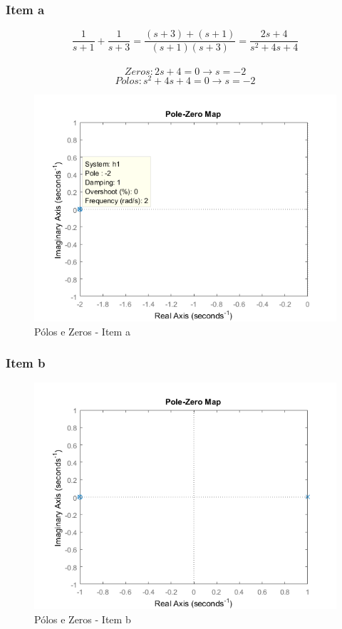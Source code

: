\documentclass[a4paper, 12pt]{article}
\begin{document}
        \subsubsection{Item a}
        \[\frac{1}{s+1} + \frac{1}{s+3} = \frac{(s+3) + (s+1)}{(s+1)(s+3)} = \frac{2s + 4}{s^{2} + 4s + 4}\]\\
        \[Zeros: 2s + 4 = 0 \rightarrow s = -2\]
        \[Polos:  s^{2} + 4s + 4 = 0 \rightarrow s = -2\]
		\begin{figure}[!ht]
			\centering
			\includegraphics{img/Q1a.png}
			\caption{P\'{o}los e Zeros - Item a}	
		\end{figure}	        
		\newpage
        \subsubsection{Item b}
		\begin{figure}[!ht]
			\centering
			\includegraphics{img/Q1b.png}
			\caption{P\'{o}los e Zeros - Item b}	
		\end{figure}	   
		
\end{document}

